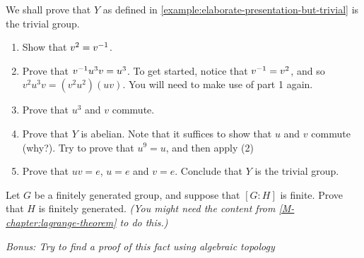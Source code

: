 \documentclass[./main.tex]{subfiles}
\begin{document}
\begin{exercise}
\label{ex:elaborate-presentation-but-trivial}
    We shall prove that $Y$ as defined in \cref{example:elaborate-presentation-but-trivial} is the trivial group.
    \begin{enumerate}
        \item Show that $v^2 = v^{-1}$.
        \item Prove that $v^{-1} u^3 v = u^3$. To get started, notice that $v^{-1}
        = v^2$, and so $v^2 u^3 v = (v^2 u^2) (uv)$. You will need to make use of part 1 again.
        \item Prove that $u^3$ and $v$ commute.
        \item Prove that $Y$ is abelian. Note that it suffices to show that $u$
        and $v$ commute (why?). Try to prove that $u^9 = u$, and then apply (2)
        \item Prove that $uv=e$, $u=e$ and $v=e$. Conclude that $Y$ is the
        trivial group.
    \end{enumerate}
\end{exercise}

\begin{prob}    
    Let $G$ be a finitely generated group, and suppose that $[G:H]$ is finite.
    Prove that $H$ is finitely generated. \textit{(You might need the content
    from \cref{M-chapter:lagrange-theorem} to do this.)}

    \textit{Bonus: Try to find a proof of this fact using algebraic topology}
\end{prob}
\end{document}
